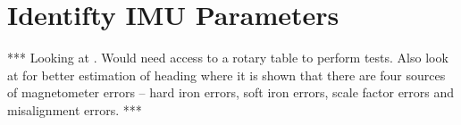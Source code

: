 \section{Identifty IMU Parameters}
\label{sec:identifyimuparams}
*** Looking at \cite{ChungOjeda01}. Would need access to a rotary table to perform tests. Also look at \cite{ParkinsonHeadingEstimation01} for better estimation of heading where it is shown that there are four sources of magnetometer errors -- hard iron errors, soft iron errors, scale factor errors and misalignment errors. ***
